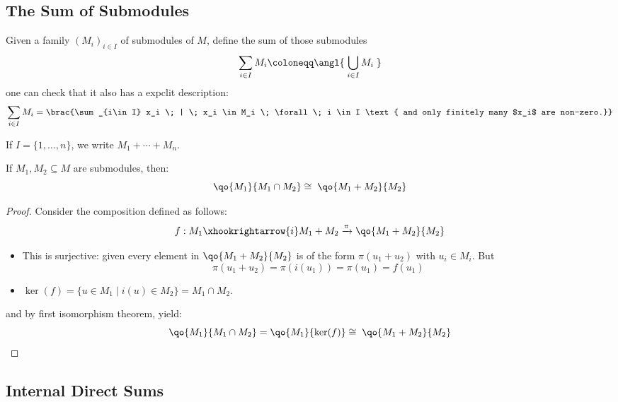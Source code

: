 \subsection{The Sum of Submodules}

\begin{definition}
	Given a family \( (M_i)_{i\in I} \) of submodules of \( M \), define the sum of those submodules
	\[
		\sum_{i\in I} M_i \coloneqq  \angl{\; \bigcup_{i\in I} M_i \; }
	\]
	one can check that it also has a expclit description:
	\[
		\sum_{i\in I} M_i = \brac{\sum_{i\in I} x_i \; | \; x_i \in M_i \; \forall \; i \in I \text{ and only
				finitely many $x_i$ are non-zero.}}
	\]
\end{definition}

\begin{notation}
	If \( I = \{1,\ldots, n\} \), we write \( M_1 + \cdots + M_n \).
\end{notation}

\begin{theorem}
	If \( M_1, M_2 \subseteq M \) are submodules, then:
	\[
		\qo{M_1}{M_1 \cap M_2} \cong \; \qo{M_1 + M_2}{M_2}
	\]
\end{theorem}

\begin{proof}
	Consider the composition defined as follows:
	\[
		f: M_1 \xhookrightarrow{i} M_1 + M_2 \xrightarrow{\pi} \qo{M_1 + M_2}{M_2}
	\]
	\begin{itemize}
		\item This is surjective: given every element in \( \qo{M_1 + M_2}{M_2} \) is of the form \(
		      \pi(u_1 + u_2) \) with \( u_i \in M_i \). But
		      \[
			      \pi(u_1 + u_2) = \pi(i(u_1)) = \pi(u_1) = f(u_1)
		      \]
		\item \( \ker(f) = \{u \in M_1 \; | \; i(u) \in M_2\} = M_1 \cap M_2 \).
	\end{itemize}
	and by first isomorphism theorem, yield:
	\[
		\qo{M_1}{M_1 \cap M_2} = \qo{M_1}{\ker(f)} \cong \; \qo{M_1 + M_2}{M_2}
	\]
\end{proof}

\subsection{Internal Direct Sums}

